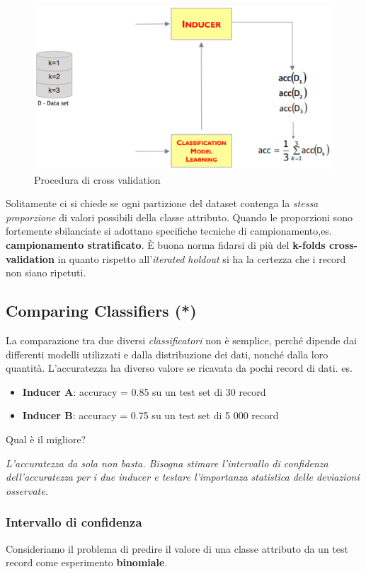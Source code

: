 \begin{figure}[H]
	\centering
	\includegraphics[height=0.4 \linewidth]{classification/pict/cross_validation.png}
	\caption{Procedura di cross validation}
\end{figure}

Solitamente ci si chiede se ogni partizione del dataset contenga la \textit{stessa proporzione} di valori possibili della classe attributo. Quando le proporzioni sono fortemente sbilanciate si adottano specifiche tecniche di campionamento,es. \textbf{campionamento stratificato}. 
\`E buona norma fidarsi di più del \textbf{k-folds cross-validation} in quanto rispetto all'\textit{iterated holdout} si ha la certezza che i record non siano ripetuti.

\subsection{Comparing Classifiers (*)}
La comparazione tra due diversi \textit{classificatori} non è semplice, perché dipende dai differenti modelli utilizzati e dalla distribuzione dei dati, nonché dalla loro quantità. L'accuratezza ha diverso valore se ricavata da pochi record di dati. 
es. 
\begin{itemize}
	\item \textbf{Inducer A}: accuracy = 0.85 su un test set di 30 record
	\item \textbf{Inducer B}: accuracy = 0.75 su un test set di 5 000 record
\end{itemize}
Qual è il migliore?

\textit{L'accuratezza da sola non basta. Bisogna stimare l'intervallo di confidenza dell'accuratezza per i due inducer e testare l'importanza statistica delle deviazioni osservate.}
 
\subsubsection{Intervallo di confidenza}
Consideriamo il problema di predire il valore di una classe attributo da un test record come esperimento \textbf{binomiale}.

